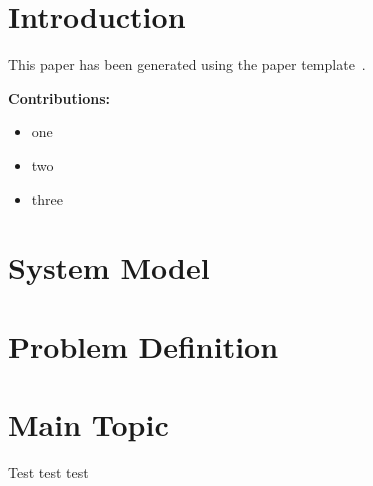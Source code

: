 \documentclass[conference]{IEEEtran}
\begin{document}


\section{Introduction}
\label{sec:introduction}

This paper has been generated using the paper template~\cite{papertemplate}.




\noindent\textbf{Contributions:} %
\begin{itemize}
    \item one
    \item two
    \item three
\end{itemize}
	
	
\section{System Model}
\label{sec:system_model}

\section{Problem Definition}
\label{sec:problem_def}

\section{Main Topic}

\begin{definition}[Test]
    Test test test
\end{definition}
\end{document}
